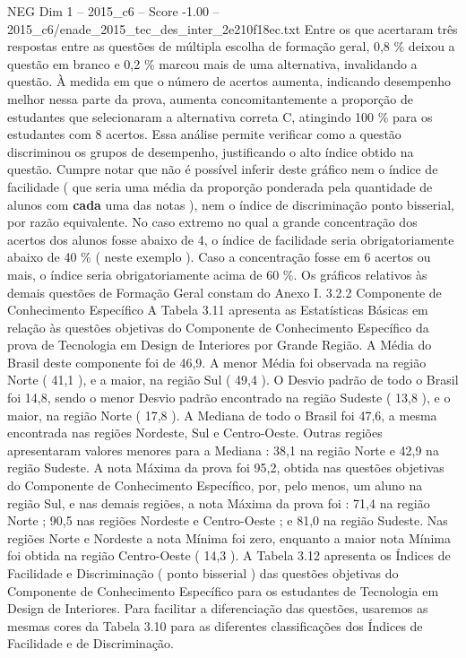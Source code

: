 \begin{textsample}{NEG Dim 1 – 2015\_c6 – Score -1.00 – 2015\_c6/enade\_2015\_tec\_des\_inter\_2e210f18ec.txt}
Entre os que acertaram três respostas entre as questões de múltipla escolha de formação geral, 0,8 \% deixou a questão em branco e 0,2 \% marcou mais de uma alternativa, invalidando a questão.
À medida em que o número de acertos aumenta, indicando desempenho melhor nessa parte da prova, aumenta concomitantemente a proporção de estudantes que selecionaram a alternativa correta C, atingindo 100 \% para os estudantes com 8 acertos.
Essa análise permite verificar como a questão discriminou os grupos de desempenho, justificando o alto índice obtido na questão.
Cumpre notar que não é possível inferir deste gráfico nem o índice de facilidade ( que seria uma média da proporção ponderada pela quantidade de alunos com \textbf{cada} uma das notas ), nem o índice de discriminação ponto bisserial, por razão equivalente.
No caso extremo no qual a grande concentração dos acertos dos alunos fosse abaixo de 4, o índice de facilidade seria obrigatoriamente abaixo de 40 \% ( neste exemplo ).
Caso a concentração fosse em 6 acertos ou mais, o índice seria obrigatoriamente acima de 60 \%.
Os gráficos relativos às demais questões de Formação Geral constam do Anexo I. 3.2.2 Componente de Conhecimento Específico A Tabela 3.11 apresenta as Estatísticas Básicas em relação às questões objetivas do Componente de Conhecimento Específico da prova de Tecnologia em Design de Interiores por Grande Região.
A Média do Brasil deste componente foi de 46,9.
A menor Média foi observada na região Norte ( 41,1 ), e a maior, na região Sul ( 49,4 ).
O Desvio padrão de todo o Brasil foi 14,8, sendo o menor Desvio padrão encontrado na região Sudeste ( 13,8 ), e o maior, na região Norte ( 17,8 ).
A Mediana de todo o Brasil foi 47,6, a mesma encontrada nas regiões Nordeste, Sul e Centro-Oeste.
Outras regiões apresentaram valores menores para a Mediana : 38,1 na região Norte e 42,9 na região Sudeste.
A nota Máxima da prova foi 95,2, obtida nas questões objetivas do Componente de Conhecimento Específico, por, pelo menos, um aluno na região Sul, e nas demais regiões, a nota Máxima da prova foi : 71,4 na região Norte ; 90,5 nas regiões Nordeste e Centro-Oeste ; e 81,0 na região Sudeste.
Nas regiões Norte e Nordeste a nota Mínima foi zero, enquanto a maior nota Mínima foi obtida na região Centro-Oeste ( 14,3 ).
A Tabela 3.12 apresenta os Índices de Facilidade e Discriminação ( ponto bisserial ) das questões objetivas do Componente de Conhecimento Específico para os estudantes de Tecnologia em Design de Interiores.
Para facilitar a diferenciação das questões, usaremos as mesmas cores da Tabela 3.10 para as diferentes classificações dos Índices de Facilidade e de Discriminação.

\end{textsample}
